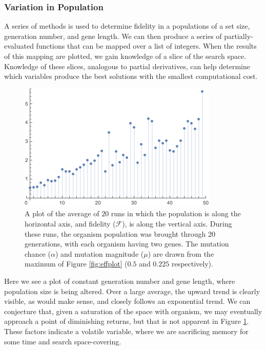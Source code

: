 \documentclass[11pt,twocolumn]{article}
\begin{document}

	\subsubsection{Variation in Population}

	A series of methods is used to determine fidelity in a populations of a set size, generation number, and gene length. We can then produce a series of partially-evaluated functions that can be mapped over a list of integers. When the results of this mapping are plotted, we gain knowledge of a slice of the search space. Knowledge of these slices, analogous to partial derivatives, can help determine which variables produce the best solutions with the smallest computational cost. 

	\begin{figure}[htpb]
		\centering
			\includegraphics[scale=0.6]{20G_Plot_2.png}
		\centering
		\caption{A plot of the average of $20$ runs in which the population is along the horizontal axis, and fidelity ($\mathcal{F}$), is along the vertical axis. During these runs, the organism population was brought through $20$ generations, with each organism having two genes. The mutation chance ($\alpha$) and mutation magnitude ($\mu$) are drawn from the maximum of Figure \ref{fig:effplot} ($0.5$ and $0.225$ respectively).}
		\label{fig:pop_plot}
	\end{figure}

	Here we see a plot of constant generation number and gene length, where population size is being altered. Over a large average, the upward trend is clearly visible, as would make sense, and closely follows an exponential trend. We can conjecture that, given a saturation of the space with organism, we may eventually approach a point of diminishing returns, but that is not apparent in Figure \ref{fig:pop_plot}. These factors indicate a volatile variable, where we are sacrificing memory for some time and search space-covering. 
\end{document}
